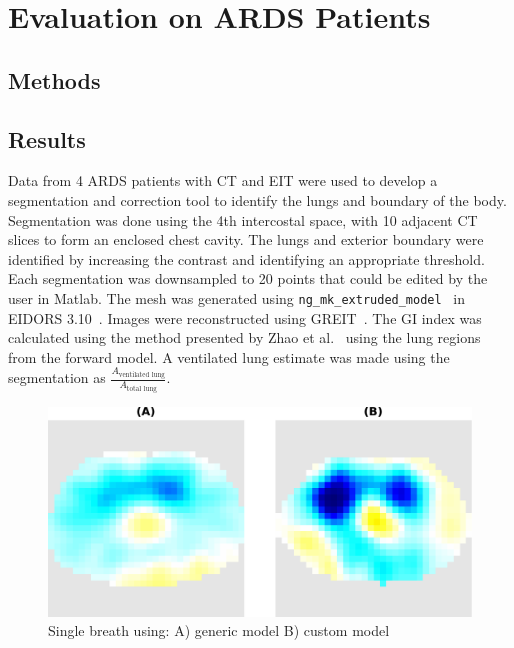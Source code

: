 \section{Evaluation on ARDS Patients}

\subsection{Methods}
\subsection{Results}
Data from 4 ARDS patients with CT
and EIT were used to develop a segmentation 
and correction tool to identify 
the lungs and boundary of the body.  
Segmentation was done using the 4th intercostal space, 
with 10 adjacent CT 
slices to form an enclosed chest cavity. 
The lungs
and exterior boundary were identified by increasing the contrast
and identifying an appropriate threshold.
Each segmentation was downsampled to
20 points that could be edited by the user in Matlab. The 
mesh was generated using 
\verb!ng_mk_extruded_model!~\cite{Grychtol2012} in EIDORS 
3.10~\cite{Adler2019}. Images were reconstructed 
using GREIT~\cite{Adler2009}. 
The GI index was calculated using the method
presented by Zhao et al.~\cite{Zhao2009} using the lung regions from the 
forward model. A ventilated lung estimate was made using the
segmentation as $\frac{A_{\text{ventilated lung}}}{A_{\text{total lung}}}$.

\begin{figure}
\centering
\includegraphics[width=\textwidth]{chapter5-CT_to_mesh/imgs/basic_vs_advanced_3_cropped.pdf}
\caption{\label{fig:ct_mesh_breath}%
Single breath using: A) generic model B) custom model
}
\end{figure}

